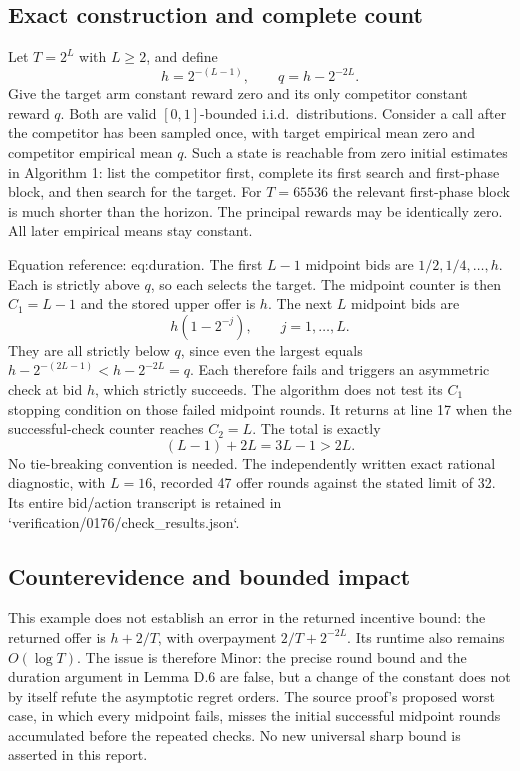 \documentclass[10pt]{article}
\begin{document}
\subsection*{Exact construction and complete count}
Let \(T=2^L\) with \(L\geq2\), and define \[h=2^{-(L-1)},\qquad q=h-2^{-2L}.\] Give the target arm constant reward zero and its only competitor constant reward \(q\). Both are valid \([0,1]\)-bounded i.i.d. distributions. Consider a call after the competitor has been sampled once, with target empirical mean zero and competitor empirical mean \(q\). Such a state is reachable from zero initial estimates in Algorithm 1: list the competitor first, complete its first search and first-phase block, and then search for the target. For \(T=65536\) the relevant first-phase block is much shorter than the horizon. The principal rewards may be identically zero. All later empirical means stay constant.\par
Equation reference: eq:duration. The first \(L-1\) midpoint bids are \(1/2,1/4,\ldots,h\). Each is strictly above \(q\), so each selects the target. The midpoint counter is then \(C_1=L-1\) and the stored upper offer is \(h\). The next \(L\) midpoint bids are \[h(1-2^{-j}),\qquad j=1,\ldots,L.\] They are all strictly below \(q\), since even the largest equals \(h-2^{-(2L-1)}<h-2^{-2L}=q\). Each therefore fails and triggers an asymmetric check at bid \(h\), which strictly succeeds. The algorithm does not test its \(C_1\) stopping condition on those failed midpoint rounds. It returns at line 17 when the successful-check counter reaches \(C_2=L\). The total is exactly \[
 (L-1)+2L=3L-1>2L.\] No tie-breaking convention is needed. The independently written exact rational diagnostic, with \(L=16\), recorded 47 offer rounds against the stated limit of 32. Its entire bid/action transcript is retained in `verification/0176/check\_results.json`.\par
\subsection*{Counterevidence and bounded impact}
This example does not establish an error in the returned incentive bound: the returned offer is \(h+2/T\), with overpayment \(2/T+2^{-2L}\). Its runtime also remains \(O(\log T)\). The issue is therefore Minor: the precise round bound and the duration argument in Lemma D.6 are false, but a change of the constant does not by itself refute the asymptotic regret orders. The source proof’s proposed worst case, in which every midpoint fails, misses the initial successful midpoint rounds accumulated before the repeated checks. No new universal sharp bound is asserted in this report.\par
\end{document}
